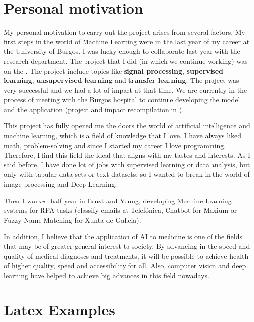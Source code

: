 \section{Personal motivation}

My personal motivation to carry out the project arises from several factors. My first steps in the world of Machine Learning were in the last year of my career at the University of Burgos. I was lucky enough to collaborate last year with the  research department. The project that I did (in which we continue working) was on the . The project include topics like \textbf{signal processing}, \textbf{supervised learning}, \textbf{unsupervised learning} and \textbf{transfer learning}. The project was very successful and we had a lot of impact at that time. We are currently in the process of meeting with the Burgos hospital to continue developing the model and the application (project and impact recompilation in ).

This project has fully opened me the doors the world of artificial intelligence and machine learning, which is a field of knowledge that I love. I have always liked math, problem-solving and since I started my career I love programming. Therefore, I find this field the ideal that aligns with my tastes and interests. As I said before, I have done lot of jobs with supervised learning or data analysis, but only with tabular data sets or text-datasets, so I wanted to break in the world of image processing and Deep Learning.

Then I worked half year in Ernst and Young, developing Machine Learning systems for RPA tasks (classify emails at Telefónica, Chatbot for Maxium or Fuzzy Name Matching for Xunta de Galicia).

In addition, I believe that the application of AI to medicine is one of the fields that may be of greater general interest to society. By advancing in the speed and quality of medical diagnoses and treatments, it will be possible to achieve health of higher quality, speed and accessibility for all. Also, computer vision and deep learning have helped to achieve big advances in this field nowadays. 


\iffalse
\section{Latex Examples}


